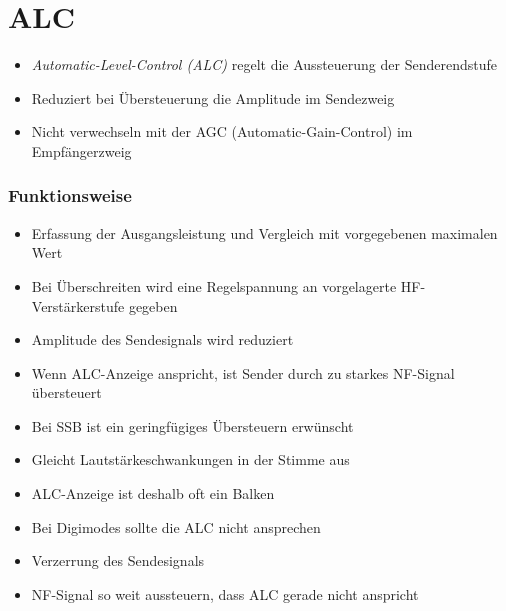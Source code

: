 
\section{ALC}
\label{section:alc}
\begin{frame}%
\begin{itemize}
  \item \emph{Automatic-Level-Control (ALC)} regelt die Aussteuerung der Senderendstufe
  \item Reduziert bei Übersteuerung die Amplitude im Sendezweig
  \item Nicht verwechseln mit der AGC (Automatic-Gain-Control) im Empfängerzweig
  \end{itemize}
\end{frame}

\begin{frame}
\frametitle{Funktionsweise}
\begin{itemize}
  \item Erfassung der Ausgangsleistung und Vergleich mit vorgegebenen maximalen Wert
  \item Bei Überschreiten wird eine Regelspannung an vorgelagerte HF-Verstärkerstufe gegeben
  \item Amplitude des Sendesignals wird reduziert
  \end{itemize}
\end{frame}

\begin{frame}\begin{itemize}
  \item Wenn ALC-Anzeige anspricht, ist Sender durch zu starkes NF-Signal übersteuert
  \item Bei SSB ist ein geringfügiges Übersteuern erwünscht
  \item Gleicht Lautstärkeschwankungen in der Stimme aus
  \item ALC-Anzeige ist deshalb oft ein Balken
  \end{itemize}
\end{frame}

\begin{frame}\begin{itemize}
  \item Bei Digimodes sollte die ALC nicht ansprechen
  \item Verzerrung des Sendesignals
  \item NF-Signal so weit aussteuern, dass ALC gerade nicht anspricht
  \end{itemize}
\end{frame}

